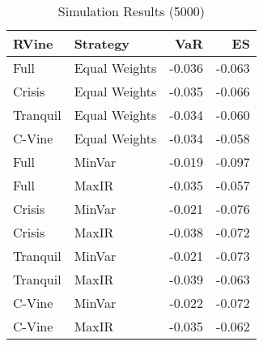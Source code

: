 \begin{table}

\caption{Simulation Results (5000)}
\centering
\begin{tabular}[t]{llrr}
\toprule
RVine & Strategy & VaR & ES\\
\midrule
Full & Equal Weights & -0.036 & -0.063\\
Crisis & Equal Weights & -0.035 & -0.066\\
Tranquil & Equal Weights & -0.034 & -0.060\\
C-Vine & Equal Weights & -0.034 & -0.058\\
Full & MinVar & -0.019 & -0.097\\
\addlinespace
Full & MaxIR & -0.035 & -0.057\\
Crisis & MinVar & -0.021 & -0.076\\
Crisis & MaxIR & -0.038 & -0.072\\
Tranquil & MinVar & -0.021 & -0.073\\
Tranquil & MaxIR & -0.039 & -0.063\\
\addlinespace
C-Vine & MinVar & -0.022 & -0.072\\
C-Vine & MaxIR & -0.035 & -0.062\\
\bottomrule
\end{tabular}
\end{table}
